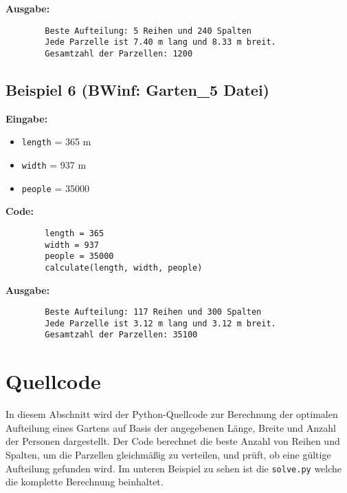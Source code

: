 \documentclass[a4paper,10pt,ngerman]{scrartcl}
\begin{document}
	\textbf{Ausgabe:}
	\begin{verbatim}
		Beste Aufteilung: 5 Reihen und 240 Spalten
		Jede Parzelle ist 7.40 m lang und 8.33 m breit.
		Gesamtzahl der Parzellen: 1200
	\end{verbatim}
	
	\subsection{Beispiel 6 (BWinf: Garten\_5 Datei)}
	
	\textbf{Eingabe:}
	\begin{itemize}
		\item \texttt{length} = 365 m
		\item \texttt{width} = 937 m
		\item \texttt{people} = 35000
	\end{itemize}
	
	\textbf{Code:}
	\begin{lstlisting}
		length = 365
		width = 937
		people = 35000
		calculate(length, width, people)
	\end{lstlisting}
	
	\textbf{Ausgabe:}
	\begin{verbatim}
		Beste Aufteilung: 117 Reihen und 300 Spalten
		Jede Parzelle ist 3.12 m lang und 3.12 m breit.
		Gesamtzahl der Parzellen: 35100
	\end{verbatim}
	
	\section{Quellcode}
	
	In diesem Abschnitt wird der Python-Quellcode zur Berechnung der optimalen Aufteilung eines Gartens auf Basis der angegebenen Länge, Breite und Anzahl der Personen dargestellt. Der Code berechnet die beste Anzahl von Reihen und Spalten, um die Parzellen gleichmäßig zu verteilen, und prüft, ob eine gültige Aufteilung gefunden wird. Im unteren Beispiel zu sehen ist die \texttt{solve.py} welche die komplette Berechnung beinhaltet. 
	
\end{document}
